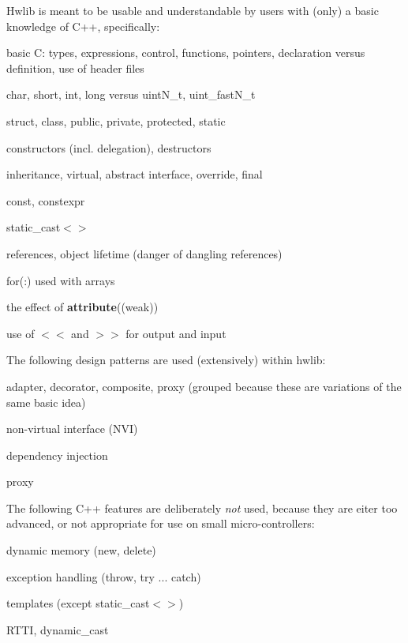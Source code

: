 Hwlib is meant to be usable and understandable by users with (only) a basic knowledge of C++, specifically\+:
\begin{DoxyItemize}
\item basic C\+: types, expressions, control, functions, pointers, declaration versus definition, use of header files
\item char, short, int, long versus uint\+N\+\_\+t, uint\+\_\+fast\+N\+\_\+t
\item struct, class, public, private, protected, static
\item constructors (incl. delegation), destructors
\item inheritance, virtual, abstract interface, override, final
\item const, constexpr
\item static\+\_\+cast$<$$>$
\item references, object lifetime (danger of dangling references)
\item for(\+:) used with arrays
\item the effect of {\bfseries attribute}((weak))
\item use of $<$$<$ and $>$$>$ for output and input
\end{DoxyItemize}

The following design patterns are used (extensively) within hwlib\+:
\begin{DoxyItemize}
\item adapter, decorator, composite, proxy (grouped because these are variations of the same basic idea)
\item non-\/virtual interface (N\+VI)
\item dependency injection
\item proxy
\end{DoxyItemize}

The following C++ features are deliberately {\itshape not} used, because they are eiter too advanced, or not appropriate for use on small micro-\/controllers\+:
\begin{DoxyItemize}
\item dynamic memory (new, delete)
\item exception handling (throw, try ... catch)
\item templates (except static\+\_\+cast$<$$>$)
\item R\+T\+TI, dynamic\+\_\+cast 
\end{DoxyItemize}